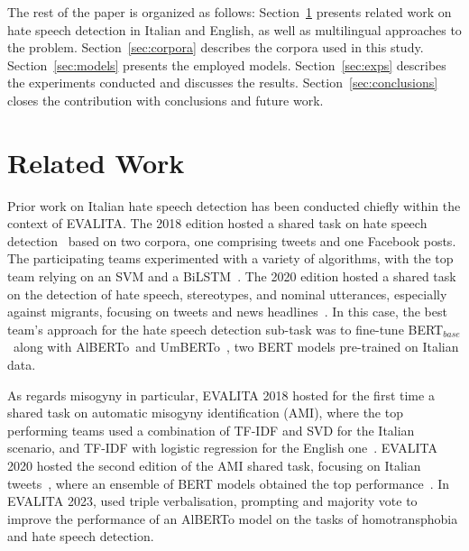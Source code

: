 \documentclass[
twocolumn,
]{ceurart}
\newcommand{\bert}{\mbox{BERT$_{base}$}}
\newcommand{\umbert}{\mbox{UmBERTo}}
\newcommand{\albert}{\mbox{AlBERTo}}
\begin{document}
The rest of the paper is organized as follows: Section~\ref{sec:related-work} presents related work on hate speech detection in Italian and English, as well as multilingual approaches to the problem. Section~\ref{sec:corpora} describes the corpora used in this study. Section~\ref{sec:models} presents the employed models. Section~\ref{sec:exps} describes the experiments conducted and discusses the results. Section~\ref{sec:conclusions} closes the contribution with conclusions and future work.

\section{Related Work}
\label{sec:related-work}

Prior work on Italian hate speech detection has been conducted chiefly within the context of EVALITA\@. The 2018 edition hosted a shared task on hate speech detection~\cite{boscoOverviewEVALITA2018} based on two corpora, one comprising tweets and one Facebook posts. The participating teams experimented with a variety of algorithms, with the top team relying on an SVM and a BiLSTM~\cite{cimino2018multi}. The 2020 edition hosted a shared task on the detection of hate speech, stereotypes, and nominal utterances, especially against migrants, focusing on tweets and news headlines~\cite{basileEVALITA2020Overview}. In this case,
the best team's approach for the hate speech detection sub-task \cite{Lavergne2020TheNorthH} was to fine-tune \bert\, \cite{devlin-etal-2019-bert} along with \albert\, \cite{PolignanoEtAlCLIC2019} and \umbert\, \cite{musixmatch-2020-umberto}, two BERT models pre-trained on Italian data.

As regards misogyny in particular, EVALITA 2018 hosted for the first time a shared task on automatic misogyny identification (AMI), where the top performing teams used a combination of TF-IDF and SVD for the Italian scenario, and TF-IDF with logistic regression for the English one~\cite{Fersini2018OverviewOT}.
EVALITA 2020 hosted the second edition of the AMI shared task, focusing on Italian tweets~\cite{fersiniAMIEVALITA2020Automatic2020}, where an ensemble of BERT models obtained the top performance~\cite{mutiUniBOAMIMultiClass2020}. In EVALITA 2023, \citet{bonaventura2023odang} used triple verbalisation, prompting and majority vote to improve the performance of an AlBERTo model on the tasks of homotransphobia and hate speech detection.
\end{document}
